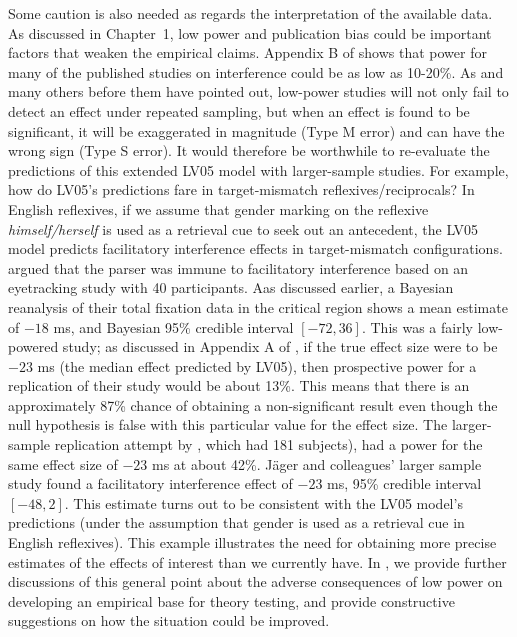 \documentclass{cambridge7A}\usepackage[]{graphicx}\usepackage[]{color}
\begin{document}
Some caution is also needed as regards the interpretation of the available data. As discussed in Chapter~1, low power and publication bias could be important factors that weaken the empirical claims. Appendix B of \cite{JaegerEngelmannVasishth2017} shows that power for many of the published studies on interference could be as low as 10-20\%. As \cite{GelmanCarlin2014} and many others before them have pointed out, low-power studies will not only fail to detect an effect under repeated sampling, but when an effect is found to be significant, it will be exaggerated in magnitude (Type M error) and can have the wrong sign (Type S error). It would therefore be worthwhile to re-evaluate the predictions of this extended LV05 model with larger-sample studies. For example, how do LV05's predictions fare in target-mismatch reflexives/reciprocals? In  English reflexives, if we assume that gender marking on the reflexive \textit{himself/herself} is used as a retrieval cue to seek out an antecedent, the LV05 model predicts facilitatory interference effects in target-mismatch configurations. 
\cite{DillonMishlerSloggett2013} argued that the parser was immune to facilitatory interference based on an eyetracking study with 40 participants. Aas discussed earlier, a Bayesian reanalysis of their total fixation data in the critical region \citep{JaegerMertzenVanDykeVasishth2019} shows a mean estimate of $-18$ ms, and Bayesian 95\% credible interval $[-72,36]$. This was a fairly low-powered study; as discussed in Appendix A of  \cite{JaegerMertzenVanDykeVasishth2019}, if the true effect size were to be $-23$ ms (the median effect predicted by LV05), then prospective power for a replication of their study would be about 13\%. This means that there is an approximately 87\% chance of obtaining a non-significant result even though the null hypothesis is false with this particular value for the effect size. The larger-sample replication attempt by   
\cite{JaegerMertzenVanDykeVasishth2019}, which had 181 subjects), had a power for the same effect size of $-23$ ms at about 42\%. J\"ager and colleagues' larger sample study found a facilitatory interference effect of $-23$ ms, 95\% credible interval $[-48,2]$. This estimate turns out to be consistent with the LV05 model's predictions (under the assumption that gender is used as a retrieval cue in English reflexives). This example illustrates the need for obtaining more precise estimates of the effects of interest than we currently have. In \cite{VasishthMertzenJaegerGelman2018}, we provide further discussions of this general point about the adverse consequences of low power on developing an empirical base for theory testing, and provide constructive suggestions on how the situation could be improved. 
\end{document}
